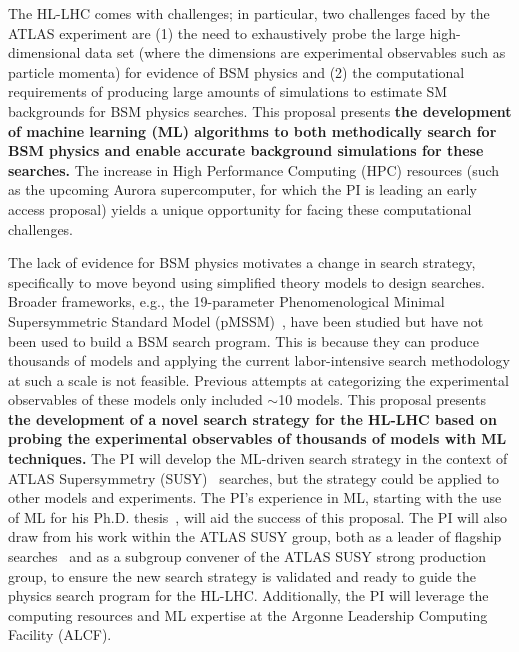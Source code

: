 \documentclass[letter, USenglish, 11pt, subfigure]{article}
\begin{document}
The HL-LHC comes with challenges; in particular, two challenges faced by the ATLAS experiment are (1) the need to exhaustively probe the large high-dimensional data set (where the dimensions are experimental observables such as particle momenta) for evidence of BSM physics and (2) the computational requirements of producing large amounts of simulations to estimate SM backgrounds for BSM physics searches. This proposal presents {\bf the development of machine learning (ML) algorithms to both methodically search for BSM physics and enable accurate background simulations for these searches.} The increase in High Performance Computing (HPC) resources (such as the upcoming Aurora supercomputer, for which the PI is leading an early access proposal) yields a unique opportunity for facing these computational challenges.

The lack of evidence for BSM physics motivates a change in search strategy, specifically to move beyond using simplified theory models to design searches. Broader frameworks, e.g., the 19-parameter Phenomenological 
Minimal Supersymmetric Standard Model (pMSSM)~\cite{Djouadi_2007,Berger:2008cq,Cahill_Rowley_2012}, have been studied but have not been used to build a BSM search program. This is because they can produce thousands of models and applying the current labor-intensive search methodology at such a scale is not feasible. Previous attempts at categorizing the experimental observables of these models only included $\sim$10 models. This proposal presents {\bf the development of a novel search strategy for the HL-LHC based on probing the experimental observables of thousands of models with ML techniques.} The PI will develop the ML-driven search strategy in the context of ATLAS Supersymmetry (SUSY)~\cite{Golfand:1971iw,Volkov:1973ix,Wess:1974tw,Wess:1974jb,Ferrara:1974pu,Salam:1974ig} searches, but the strategy could be applied to other models and experiments. The PI's experience in ML, starting with the use of ML for his Ph.D. thesis~\cite{Aaltonen:2011fi,Aaltonen:2013as}, will aid the success of this proposal. The PI will also draw from his work within the ATLAS SUSY group, both as a leader of flagship searches~\cite{stop0L_1,stopRun1,stop0L_2,stop0L_3} and as a subgroup convener of the ATLAS SUSY strong production group, to ensure the new search strategy is validated and ready to guide the physics search program for the HL-LHC. Additionally, the PI will leverage the computing resources and ML expertise at the Argonne Leadership Computing Facility (ALCF).
\end{document}
